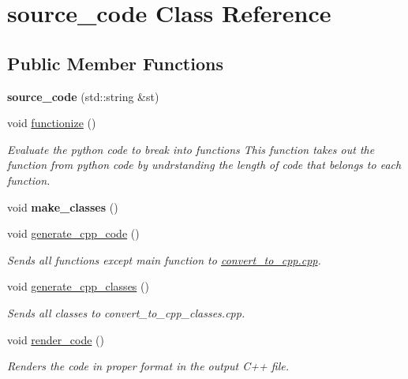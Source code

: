 \hypertarget{classsource__code}{\section{source\-\_\-code Class Reference}
\label{classsource__code}
}
\subsection*{Public Member Functions}
\begin{DoxyCompactItemize}
\item 
\hypertarget{classsource__code_abaa948e56e2fcd50d4ce693f724d8687}{{\bfseries source\-\_\-code} (std\-::string \&st)}\label{classsource__code_abaa948e56e2fcd50d4ce693f724d8687}

\item 
void \hyperlink{classsource__code_aa728639debb35735e26b6263640af582}{functionize} ()
\begin{DoxyCompactList}\small\item\em Evaluate the python code to break into functions This function takes out the function from python code by undrstanding the length of code that belongs to each function. \end{DoxyCompactList}\item 
\hypertarget{classsource__code_a3738fc644f820ae38c544b7a07b34141}{void {\bfseries make\-\_\-classes} ()}\label{classsource__code_a3738fc644f820ae38c544b7a07b34141}

\item 
void \hyperlink{classsource__code_a2bef035b81554f6bf620603d561af9a7}{generate\-\_\-cpp\-\_\-code} ()
\begin{DoxyCompactList}\small\item\em Sends all functions except main function to \hyperlink{convert__to__cpp_8cpp}{convert\-\_\-to\-\_\-cpp.\-cpp}. \end{DoxyCompactList}\item 
void \hyperlink{classsource__code_a75aeef71dfeb0cdc150e7e4ef9f1cf51}{generate\-\_\-cpp\-\_\-classes} ()
\begin{DoxyCompactList}\small\item\em Sends all classes to convert\-\_\-to\-\_\-cpp\-\_\-classes.\-cpp. \end{DoxyCompactList}\item 
void \hyperlink{classsource__code_a5a9ae302faa54d8e263f1b5c5571f5b1}{render\-\_\-code} ()
\begin{DoxyCompactList}\small\item\em Renders the code in proper format in the output C++ file. \end{DoxyCompactList}\end{DoxyCompactItemize}
